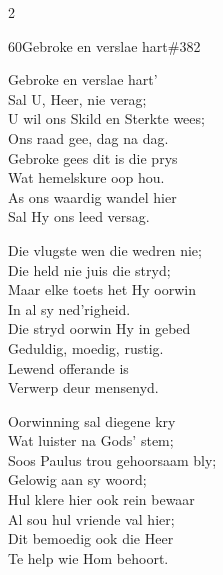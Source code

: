 \documentclass{article}
\begin{document}
\begin{multicols}{2}
\begin{hymn}{60}{Gebroke en verslae hart}{\#382}
\begin{stanza}
Gebroke en verslae hart'\\
Sal U, Heer, nie verag;\\
U wil ons Skild en Sterkte wees;\\
Ons raad gee, dag na dag.\\
Gebroke gees dit is die prys\\
Wat hemelskure oop hou.\\
As ons waardig wandel hier\\
Sal Hy ons leed versag.
\end{stanza}
\begin{stanza}
Die vlugste wen die wedren nie;\\
Die held nie juis die stryd;\\
Maar elke toets het Hy oorwin\\
In al sy ned'righeid.\\
Die stryd oorwin Hy in gebed\\
Geduldig, moedig, rustig.\\
Lewend offerande is\\
Verwerp deur mensenyd.
\end{stanza}
\begin{stanza}
Oorwinning sal diegene kry\\
Wat luister na Gods' stem;\\
Soos Paulus trou gehoorsaam bly;\\
Gelowig aan sy woord;\\
Hul klere hier ook rein bewaar\\
Al sou hul vriende val hier;\\
Dit bemoedig ook die Heer\\
Te help wie Hom behoort.
\end{stanza}
\end{hymn}


\end{multicols}
\end{document}
